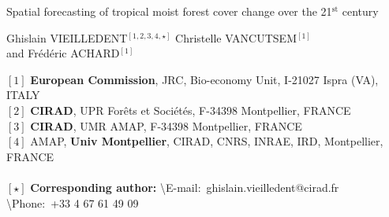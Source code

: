 \renewcommand{\bibsection}{}  %

\begin{center}
  \LARGE{Spatial forecasting of tropical moist forest cover change over the 21$^{\text{st}}$ century}
\end{center}

\vspace{1cm}

\begin{center}
  \large{
  Ghislain VIEILLEDENT$^{[1, 2, 3, 4, \star]}$ \hspace{0.5cm} Christelle VANCUTSEM$^{[1]}$\\
  \vspace{0.5cm}
  and \hspace{0.5cm} Frédéric ACHARD$^{[1]}$
  }
\end{center}

\vspace{1cm}

{\small
  \begin{flushleft}  
    $[1]$ \textbf{European Commission}, JRC, Bio-economy Unit, I-21027 Ispra (VA), ITALY\\
    $[2]$ \textbf{CIRAD}, UPR Forêts et Sociétés, F-34398 Montpellier, FRANCE\\
    $[3]$ \textbf{CIRAD}, UMR AMAP, F-34398 Montpellier, FRANCE\\
    $[4]$ AMAP, \textbf{Univ Montpellier}, CIRAD, CNRS, INRAE, IRD, Montpellier, FRANCE\\
    ~\\
    $[\star]$ \textbf{Corresponding author:}
    \textbackslash{E-mail}:~ghislain.vieilledent@cirad.fr
    \textbackslash{Phone}:~+33 4 67 61 49 09\\
  \end{flushleft}}

\newpage
